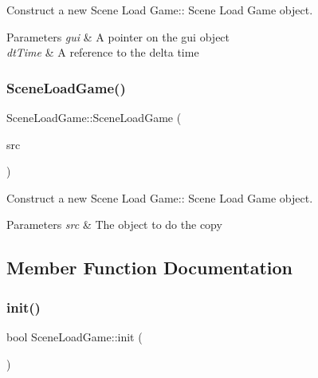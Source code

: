 Construct a new Scene Load Game\+:\+: Scene Load Game object. 


\begin{DoxyParams}{Parameters}
{\em gui} & A pointer on the gui object \\
\hline
{\em dt\+Time} & A reference to the delta time \\
\hline
\end{DoxyParams}
\mbox{\label{class_scene_load_game_a6975b7ed837cad31ed3e97b84305e63e}} 
\subsubsection{\texorpdfstring{Scene\+Load\+Game()}{SceneLoadGame()}\hspace{0.1cm}{\footnotesize\ttfamily [2/2]}}
{\footnotesize\ttfamily Scene\+Load\+Game\+::\+Scene\+Load\+Game (\begin{DoxyParamCaption}\item[{\hyperlink{class_scene_load_game}{Scene\+Load\+Game} const \&}]{src }\end{DoxyParamCaption})}



Construct a new Scene Load Game\+:\+: Scene Load Game object. 


\begin{DoxyParams}{Parameters}
{\em src} & The object to do the copy \\
\hline
\end{DoxyParams}


\subsection{Member Function Documentation}
\mbox{\label{class_scene_load_game_a4ef89351e679b7f681fa55e5f723dd16}} 
\subsubsection{\texorpdfstring{init()}{init()}}
{\footnotesize\ttfamily bool Scene\+Load\+Game\+::init (\begin{DoxyParamCaption}{ }\end{DoxyParamCaption})\hspace{0.3cm}{\ttfamily [virtual]}}



